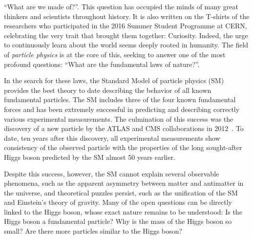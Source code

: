 
``What are we made of?''. This question has occupied the minds of many great thinkers and scientists throughout history. It is also written on the T-shirts of the researchers who participated in the 2016 Summer Student Programme at CERN, celebrating the very trait that brought them together: Curiosity. Indeed, the urge to continuously learn about the world seems deeply rooted in humanity.
The field of \emph{particle physics} is at the core of this, seeking to answer one of the most profound questions: ``What are the fundamental laws of nature?''.

In the search for these laws, the Standard Model of particle physics (SM) provides the best theory to date describing the behavior of all known fundamental particles. 
The SM includes three of the four known fundamental forces and has been extremely successful in predicting and describing correctly various experimental measurements. 
The culmination of this success was the discovery of a new particle by the ATLAS and CMS collaborations in 2012~\cite{HIGG-2012-27,CMS-HIG-12-028}.
To date, ten years after this discovery, all experimental measurements show consistency of the observed particle with the properties of the long sought-after Higgs boson predicted by the SM almost 50 years earlier.

Despite this success, however, the SM cannot explain several observable phenomena, such as the apparent asymmetry between matter and antimatter in the universe, and theoretical puzzles persist, such as the unification of the SM and Einstein's theory of gravity.
Many of the open questions can be directly linked to the Higgs boson, whose exact nature remains to be understood: Is the Higgs boson a fundamental particle? Why is the mass of the Higgs boson so small? Are there more particles similar to the Higgs boson?


